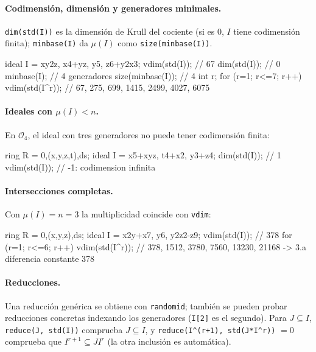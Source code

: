 \documentclass[11pt,a4paper]{article}
\begin{document}
\paragraph{Codimensión, dimensión y generadores minimales.} \texttt{dim(std(I))} es la dimensión de Krull del cociente (si es $0$, $I$ tiene codimensión finita); \texttt{minbase(I)} da $\mu(I)$ como \texttt{size(minbase(I))}.

\begin{singular}
ideal I = xy2z, x4+yz, y5, z6+y2x3;
vdim(std(I));               // 67
dim(std(I));                // 0
minbase(I);                 // 4 generadores
size(minbase(I));           // 4
int r;
for (r=1; r<=7; r++) { vdim(std(I^r)); }
// 67, 275, 699, 1415, 2499, 4027, 6075
\end{singular}

\paragraph{Ideales con $\mu(I) < n$.} En $\mathcal{O}_4$, el ideal con tres generadores no puede tener codimensión finita:

\begin{singular}
ring R = 0,(x,y,z,t),ds;
ideal I = x5+xyz, t4+x2, y3+z4;
dim(std(I));                // 1
vdim(std(I));               // -1: codimension infinita
\end{singular}

\paragraph{Intersecciones completas.} Con $\mu(I) = n = 3$ la multiplicidad coincide con \texttt{vdim}:

\begin{singular}
ring R = 0,(x,y,z),ds;
ideal I = x2y+x7, y6, y2z2-z9;
vdim(std(I));               // 378
for (r=1; r<=6; r++) { vdim(std(I^r)); }
// 378, 1512, 3780, 7560, 13230, 21168 -> 3.a diferencia constante 378
\end{singular}

\paragraph{Reducciones.} Una reducción genérica se obtiene con \texttt{randomid}; también se pueden probar reducciones concretas indexando los generadores (\texttt{I[2]} es el segundo). Para $J \subseteq I$, \texttt{reduce(J, std(I))} comprueba $J \subseteq I$, y \texttt{reduce(I\^{}(r+1), std(J*I\^{}r))} $=0$ comprueba que $I^{r+1} \subseteq J I^r$ (la otra inclusión es automática).
\end{document}
